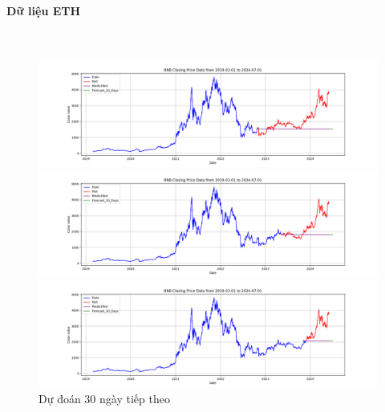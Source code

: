 \documentclass[conference]{IEEEtran}
\begin{document}
	\paragraph{\textbf{Dữ liệu ETH}} \mbox{} \\
	\begin{figure}[H]
		\centering
		\begin{minipage}{0.15\textwidth}
			\centering
			\includegraphics[width=1\textwidth]{Figure/ARIMA_ETH_30days_73.png}
		\end{minipage}
		\hfill
		\begin{minipage}{0.15\textwidth}
			\centering
			\includegraphics[width=1\textwidth]{Figure/ARIMA_ETH_30days_82.png}
		\end{minipage}
		\hfill
		\begin{minipage}{0.15\textwidth}
			\centering
			\includegraphics[width=1\textwidth]{Figure/ARIMA_ETH_30days_91.png}
		\end{minipage}
		\caption{Dự đoán 30 ngày tiếp theo}
		\label{fig:1}
	\end{figure}
	
\end{document}
